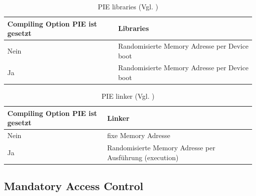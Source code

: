 \begin{table}
    \begin{center}
      \begin{tabular}{|p{6cm}|p{9cm}|} \hline
            Compiling Option PIE ist gesetzt & Libraries \\ \hline
            Nein & Randomisierte Memory Adresse per Device boot\\ \hline
            Ja & Randomisierte Memory Adresse per Device boot \\ \hline
        \end{tabular}
        \caption{PIE libraries (Vgl. \cite{iOSSec[5]})}
       \label{tab:PIE libraries}
    \end{center}
\end{table}

 \begin{table}
    \begin{center}
        \begin{tabular}{|p{6cm}|p{9cm}|} \hline
            Compiling Option PIE ist gesetzt & Linker  \\ \hline
            Nein & fixe Memory Adresse\\ \hline
            Ja & Randomisierte Memory Adresse per Ausführung (execution)\\ \hline
        \end{tabular}
        \caption{PIE linker (Vgl. \cite{iOSSec[5]})}
       \label{tab:PIE linker }
    \end{center}
\end{table}

\subsection{Mandatory Access Control}
\label{sec:MAC}

